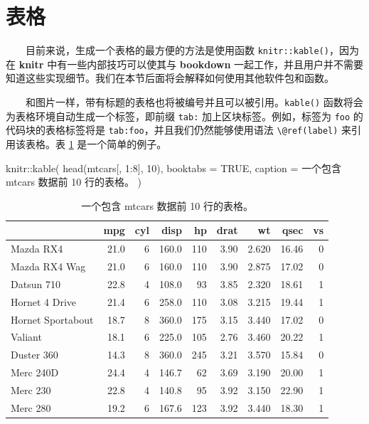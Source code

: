\documentclass[
  12pt,
]{krantz}
\newenvironment{Shaded}{\begin{snugshade}}{\end{snugshade}}
\newcommand{\AttributeTok}[1]{\textcolor[rgb]{0.77,0.63,0.00}{#1}}
\newcommand{\ConstantTok}[1]{\textcolor[rgb]{0.00,0.00,0.00}{#1}}
\newcommand{\DecValTok}[1]{\textcolor[rgb]{0.00,0.00,0.81}{#1}}
\newcommand{\FunctionTok}[1]{\textcolor[rgb]{0.00,0.00,0.00}{#1}}
\newcommand{\NormalTok}[1]{#1}
\newcommand{\SpecialCharTok}[1]{\textcolor[rgb]{0.00,0.00,0.00}{#1}}
\newcommand{\StringTok}[1]{\textcolor[rgb]{0.31,0.60,0.02}{#1}}
\theoremstyle{definition}
\theoremstyle{definition}
\theoremstyle{definition}
\theoremstyle{definition}
\theoremstyle{remark}
\begin{document}
\hypertarget{tables}{%
\section{表格}\label{tables}}

  目前来说，生成一个表格的最方便的方法是使用函数 \texttt{knitr::kable()}，因为在 \textbf{knitr} 中有一些内部技巧可以使其与 \textbf{bookdown} 一起工作，并且用户并不需要知道这些实现细节。我们在本节后面将会解释如何使用其他软件包和函数。

  和图片一样，带有标题的表格也将被编号并且可以被引用。\texttt{kable()} 函数将会为表格环境自动生成一个标签，即前缀 \texttt{tab:} 加上区块标签。例如，标签为 \texttt{foo} 的代码块的表格标签将是 \texttt{tab:foo}，并且我们仍然能够使用语法 \texttt{\textbackslash{}@ref(label)} 来引用该表格。表 \ref{tab:table-single} 是一个简单的例子。

\begin{Shaded}
\begin{Highlighting}[]
\NormalTok{knitr}\SpecialCharTok{::}\FunctionTok{kable}\NormalTok{(}
  \FunctionTok{head}\NormalTok{(mtcars[, }\DecValTok{1}\SpecialCharTok{:}\DecValTok{8}\NormalTok{], }\DecValTok{10}\NormalTok{), }\AttributeTok{booktabs =} \ConstantTok{TRUE}\NormalTok{,}
  \AttributeTok{caption =} \StringTok{\textquotesingle{}一个包含 mtcars 数据前 10 行的表格。\textquotesingle{}}
\NormalTok{)}
\end{Highlighting}
\end{Shaded}

\begin{table}

\caption{\label{tab:table-single}一个包含 mtcars 数据前 10 行的表格。}
\centering
\begin{tabular}[t]{lrrrrrrrr}
\toprule
  & mpg & cyl & disp & hp & drat & wt & qsec & vs\\
\midrule
Mazda RX4 & 21.0 & 6 & 160.0 & 110 & 3.90 & 2.620 & 16.46 & 0\\
Mazda RX4 Wag & 21.0 & 6 & 160.0 & 110 & 3.90 & 2.875 & 17.02 & 0\\
Datsun 710 & 22.8 & 4 & 108.0 & 93 & 3.85 & 2.320 & 18.61 & 1\\
Hornet 4 Drive & 21.4 & 6 & 258.0 & 110 & 3.08 & 3.215 & 19.44 & 1\\
Hornet Sportabout & 18.7 & 8 & 360.0 & 175 & 3.15 & 3.440 & 17.02 & 0\\
\addlinespace
Valiant & 18.1 & 6 & 225.0 & 105 & 2.76 & 3.460 & 20.22 & 1\\
Duster 360 & 14.3 & 8 & 360.0 & 245 & 3.21 & 3.570 & 15.84 & 0\\
Merc 240D & 24.4 & 4 & 146.7 & 62 & 3.69 & 3.190 & 20.00 & 1\\
Merc 230 & 22.8 & 4 & 140.8 & 95 & 3.92 & 3.150 & 22.90 & 1\\
Merc 280 & 19.2 & 6 & 167.6 & 123 & 3.92 & 3.440 & 18.30 & 1\\
\bottomrule
\end{tabular}
\end{table}
\end{document}
